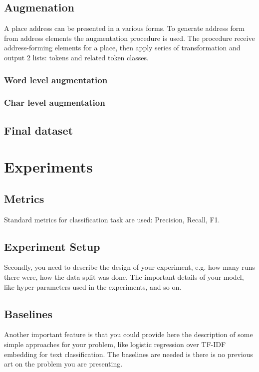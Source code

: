 \documentclass{article}
\begin{document}
\subsection{Augmenation}

A place address can be presented in a various forms.
To generate address form from address elements the augmentation procedure is used.
The procedure receive address-forming elements for a place, then apply series of transformation and output 2 lists: tokens and related token classes.

\subsubsection{Word level augmentation}
\subsubsection{Char level augmentation}

\cite{martynov2023augmentation}


\subsection{Final dataset}

\section{Experiments}

\subsection{Metrics}
Standard metrics for classification task are used: Precision, Recall, F1.

\subsection{Experiment Setup}
Secondly, you need to describe the design of your experiment, e.g. how many runs there were, how the data split was done. The important details of your model, like hyper-parameters used in the experiments, and so on.

\subsection{Baselines}
Another important feature is that you could provide here the description of some simple approaches for your problem, like logistic regression over TF-IDF embedding for text classification. The baselines are needed is there is no previous art on the problem you are presenting.
\end{document}
